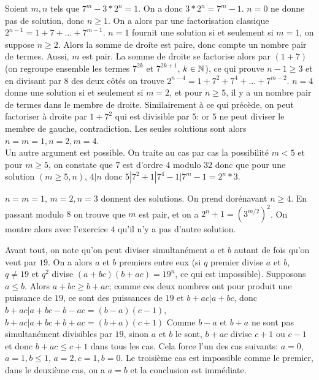 \begin{sol}[25]
		Soient $m,n$ tels que $7^m-3*2^n=1$. On a donc $3*2^n=7^m-1$. $n=0$ ne donne pas de solution, donc $n \geq 1$. On a alors par une factorisation classique $2^{n-1}=1+7+\ldots+7^{m-1}$. $n=1$ fournit une solution si et seulement si $m=1$, on suppose $n \geq 2$. Alors la somme de droite est paire, donc compte un nombre pair de termes. Aussi, $m$ est pair. La somme de droite se factorise alors par $(1+7)$ (on regroupe ensemble les termes $7^{2k}$ et $7^{2k+1}$, $k \in \mathbb{N}$), ce qui prouve $n-1 \geq 3$ et en divisant par $8$ des deux c\^ot\'es on trouve $2^{n-4}=1+7^2+7^4+\ldots+7^{m-2}$. 
		$n=4$ donne une solution si et seulement si $m=2$, et pour $n \geq 5$, il y a un nombre pair de termes dans le membre de droite.  Similairement \`a ce qui pr\'ec\`ede, on peut factoriser \`a droite par $1+7^2$ qui est divisible par $5$: or $5$ ne peut diviser le membre de gauche, contradiction. Les seules solutions sont alors $n=m=1,n=2,m=4$.\\
		Un autre argument est possible. On traite au cas par cas la possibilit\'e $m < 5$ et pour $m \geq 5$, on constate que $7$ est d'ordre $4$ modulo $32$ donc que pour une solution $(m \geq 5,n)$, $4|n$ donc $5|7^2+1|7^4-1|7^m-1=2^n*3$. 
\end{sol}

\begin{sol}[26]
		$n=m=1$, $m=2,n=3$ donnent des solutions. On prend dor\'enavant $n \geq 4$. En passant modulo $8$ on trouve que $m$ est pair, et on a $2^n+1=(3^{m/2})^2$. On montre alors avec l'exercice $4$ qu'il n'y a pas d'autre solution.
\end{sol}

\begin{sol}[27]
		Avant tout, on note qu'on peut diviser simultan\'ement $a$ et $b$ autant de fois qu'on veut par $19$. On a alors $a$ et $b$ premiers entre eux (si $q$ premier divise $a$ et $b$, $q \neq 19$ et $q^2$ divise $(a+bc)(b+ac)=19^n$, ce qui est impossible). Supposons $a \leq b$. Alors $a+bc \geq b+ac$; comme ces deux nombres ont pour produit une puissance de $19$, ce sont des puissances de $19$ et $b+ac|a+bc$, donc $b+ac|a+bc-b-ac=(b-a)(c-1)$, $b+ac|a+bc+b+ac=(b+a)(c+1)$ Comme $b-a$ et $b+a$ ne sont pas simultan\'ement divisibles par $19$, sinon $a$ et $b$ le sont, $b+ac$ divise $c+1$ ou $c-1$ et donc $b+ac \leq c+1$ dans tous les cas. Cela force l'un des cas suivants: $a=0$, $a=1,b \leq 1$, $a=2, c=1, b=0$. Le troisi\`eme cas est impossible comme le premier, dans le deuxi\`eme cas, on a $a=b$ et la conclusion est imm\'ediate.
\end{sol}


